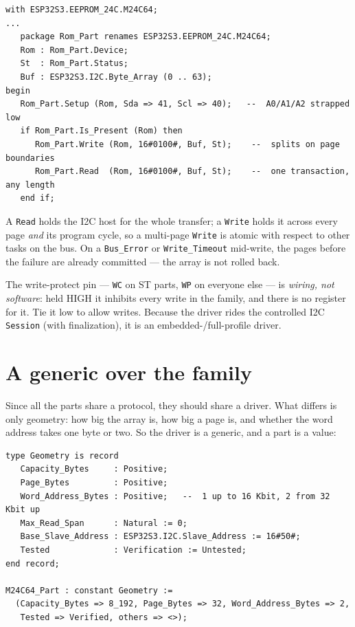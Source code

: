 \begin{lstlisting}
with ESP32S3.EEPROM_24C.M24C64;
...
   package Rom_Part renames ESP32S3.EEPROM_24C.M24C64;
   Rom : Rom_Part.Device;
   St  : Rom_Part.Status;
   Buf : ESP32S3.I2C.Byte_Array (0 .. 63);
begin
   Rom_Part.Setup (Rom, Sda => 41, Scl => 40);   --  A0/A1/A2 strapped low
   if Rom_Part.Is_Present (Rom) then
      Rom_Part.Write (Rom, 16#0100#, Buf, St);    --  splits on page boundaries
      Rom_Part.Read  (Rom, 16#0100#, Buf, St);    --  one transaction, any length
   end if;
\end{lstlisting}

A \texttt{Read} holds the I2C host for the whole transfer; a \texttt{Write} holds
it across every page \emph{and} its program cycle, so a multi-page \texttt{Write}
is atomic with respect to other tasks on the bus. On a \texttt{Bus\_Error} or
\texttt{Write\_Timeout} mid-write, the pages before the failure are already
committed --- the array is not rolled back.

The write-protect pin --- \texttt{WC} on ST parts, \texttt{WP} on everyone
else --- is \emph{wiring, not software}: held HIGH it inhibits every write in the
family, and there is no register for it. Tie it low to allow writes. Because the
driver rides the controlled I2C \texttt{Session} (with finalization), it is an
embedded-/full-profile driver.

\section{A generic over the family}

Since all the parts share a protocol, they should share a driver. What differs is
only geometry: how big the array is, how big a page is, and whether the word
address takes one byte or two. So the driver is a generic, and a part is a value:

\begin{lstlisting}
type Geometry is record
   Capacity_Bytes     : Positive;
   Page_Bytes         : Positive;
   Word_Address_Bytes : Positive;   --  1 up to 16 Kbit, 2 from 32 Kbit up
   Max_Read_Span      : Natural := 0;
   Base_Slave_Address : ESP32S3.I2C.Slave_Address := 16#50#;
   Tested             : Verification := Untested;
end record;

M24C64_Part : constant Geometry :=
  (Capacity_Bytes => 8_192, Page_Bytes => 32, Word_Address_Bytes => 2,
   Tested => Verified, others => <>);
\end{lstlisting}

